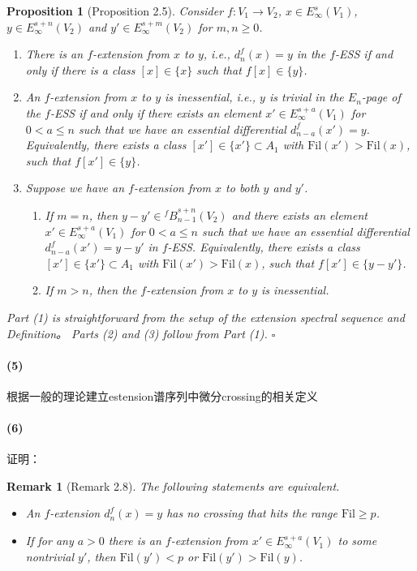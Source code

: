 \documentclass[12pt,a4paper]{article}
\renewenvironment{proof}{{\noindent\it\textbf{Proof}}\quad\it}{\hfill$\square$}
\newtheorem{prop}[equation]{Proposition}
\newtheorem{rem}[equation]{Remark}
\begin{document}
\begin{sloppy}
\begin{prop}[Proposition 2.5]
Consider $f: V_1 \to V_2$, $x \in E_\infty^{s}(V_1)$, $y \in E_\infty^{s+n}(V_2)$ and $y' \in E_\infty^{s+m}(V_2)$ for $m, n \geq 0$.
\begin{enumerate}
\item[(1)] There is an $f$-extension from $x$ to $y$, i.e., $d_n^f(x) = y$ in the $f$-ESS if and only if there is a class $[x] \in \{x\}$ such that $f[x] \in \{y\}$.
\item[(2)] An $f$-extension from $x$ to $y$ is inessential, i.e., $y$ is trivial in the $E_n$-page of the $f$-ESS if and only if there exists an element $x' \in E_\infty^{s+a}(V_1)$ for $0 < a \leq n$ such that we have an essential differential $d_{n-a}^f(x') = y$. Equivalently, there exists a class $[x'] \in \{x'\} \subset A_1$ with $\mathrm{Fil}(x') > \mathrm{Fil}(x)$, such that $f[x'] \in \{y\}$.
\item[(3)] Suppose we have an $f$-extension from $x$ to both $y$ and $y'$.
\begin{enumerate}
\item[(a)] If $m = n$, then $y - y' \in {{}^f\!B}_{n-1}^{s+n}(V_2)$ and there exists an element $x' \in E_\infty^{s+a}(V_1)$ for $0 < a \leq n$ such that we have an essential differential $d_{n-a}^f(x') = y - y'$ in $f$-ESS. Equivalently, there exists a class $[x'] \in \{x'\} \subset A_1$ with $\mathrm{Fil}(x') > \mathrm{Fil}(x)$, such that $f[x'] \in \{y - y'\}$.
\item[(b)] If $m > n$, then the $f$-extension from $x$ to $y$ is inessential.
\end{enumerate}
\end{enumerate}
\end{prop}
\begin{proof}
Part (1) is straightforward from the setup of the extension spectral sequence and Definition。 Parts (2) and (3) follow from Part (1).
\end{proof}

\paragraph{(5)} 根据一般的理论建立estension谱序列中微分crossing的相关定义

\paragraph{(6)}证明：

\begin{rem}[Remark 2.8]
The following statements are equivalent.
\begin{itemize}
\item An $f$-extension $d_n^f(x) = y$ has no crossing that hits the range $\mathrm{Fil} \geq p$.
\item If for any $a > 0$ there is an $f$-extension from $x' \in E_\infty^{s+a}(V_1)$ to some nontrivial $y'$, then $\mathrm{Fil}(y') < p$ or $\mathrm{Fil}(y') > \mathrm{Fil}(y)$.
\end{itemize}
\end{rem}


\end{sloppy}
\end{document}

